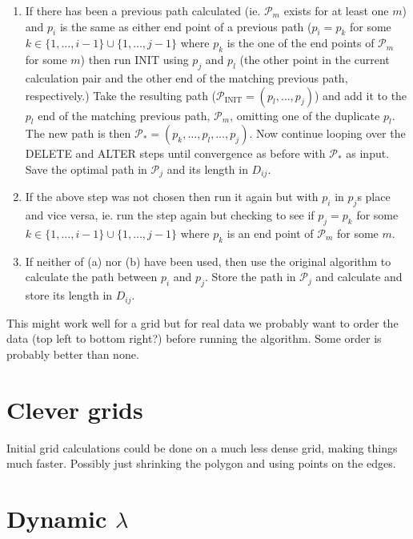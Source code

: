 \documentclass[a4paper,10pt]{article}
\begin{document}
\begin{enumerate}
\begin{enumerate}
\item If there has been a previous path calculated (ie. $\mathcal{P}_m$ exists for at least one $m$) and $p_i$ is the same as either end point of a previous path ($p_i=p_{k}$ for some $k \in \{1,\dots, i-1\} \cup \{1,\dots, j-1\}$ where $p_k$ is the one of the end points of $\mathcal{P}_m$ for some $m$) then run INIT using $p_j$ and $p_l$ (the other point in the current calculation pair and the other end of the matching previous path, respectively.) Take the resulting path ($\mathcal{P}_\text{INIT}=(p_l, \dots, p_j)$) and add it to the $p_l$ end of the matching previous path, $\mathcal{P}_m$, omitting one of the duplicate $p_l$. The new path is then $\mathcal{P}_*=(p_k, \dots, p_l, \dots, p_j)$. Now continue looping over the DELETE and ALTER steps until convergence as before with $\mathcal{P}_*$ as input. Save the optimal path in $\mathcal{P}_j$ and its length in $D_{ij}$.

\item If the above step was not chosen then run it again but with $p_i$ in $p_j$s place and vice versa, ie. run the step again but checking to see if $p_j =p_{k}$ for some $k \in \{1,\dots, i-1\} \cup \{1,\dots, j-1\}$ where $p_k$ is an end point of $\mathcal{P}_m$ for some $m$.

\item If neither of (a) nor (b) have been used, then use the original algorithm to calculate the path between $p_i$ and $p_j$. Store the path in $\mathcal{P}_{j}$ and calculate and store its length in $D_{ij}$.

\end{enumerate}
\end{enumerate}

This might work well for a grid but for real data we probably want to order the data (top left to bottom right?) before running the algorithm. Some order is probably better than none.



\section{Clever grids}

Initial grid calculations could be done on a much less dense grid, making things much faster. Possibly just shrinking the polygon and using points on the edges.

\section{Dynamic $\lambda$}
\end{document}
